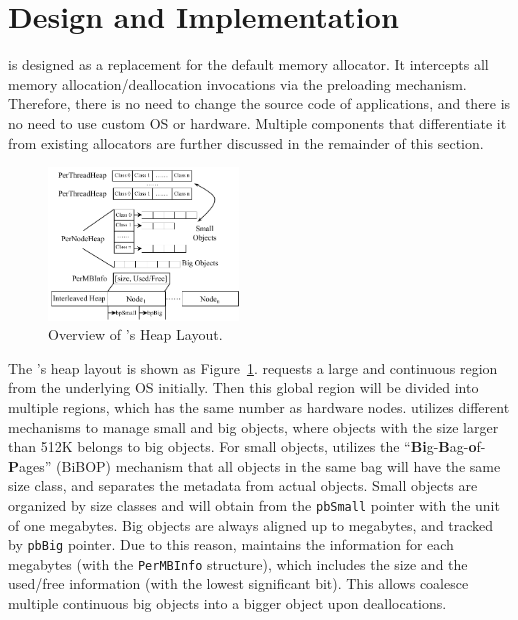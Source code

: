 \section{Design and Implementation}
\label{sec:implement}

\NM{} is designed as a replacement for the default memory allocator. It intercepts all memory allocation/deallocation invocations via the preloading mechanism. Therefore, there is no need to change the source code of applications, and there is no need to use custom OS or hardware. Multiple components that differentiate it from existing allocators are further discussed in the remainder of this section.

\begin{figure}[!ht]
\begin{center}
\includegraphics[width=0.45\textwidth]{figure/heaplayout1}
\end{center}
\vspace{-0.1in}
\caption{Overview of \NA{}'s Heap Layout.
\label{fig:overview}}
\vspace{-0.1in}
\end{figure}

The \NM{}'s heap layout is shown as Figure~\ref{fig:overview}. \NM{} requests a large and continuous region from the underlying OS initially. Then this global region will be divided into multiple regions, which has the same number as  hardware nodes. \NM{} utilizes different mechanisms to manage small and big objects, where objects with the size larger than 512K belongs to big objects. For small objects, \NM{} utilizes the ``\textbf{Bi}g-\textbf{B}ag-\textbf{o}f-\textbf{P}ages'' (BiBOP) mechanism that all objects in the same bag will have the same size class, and separates the metadata from actual objects. Small objects are organized by size classes and will obtain from the \texttt{pbSmall} pointer with the unit of one megabytes. Big objects are always aligned up to megabytes, and tracked by \texttt{pbBig} pointer. Due to this reason, \NM{} maintains the information for each megabytes (with the \texttt{PerMBInfo} structure), which includes the size and the used/free information (with the lowest significant bit). This allows  \NM{} coalesce multiple continuous big objects into a bigger object upon deallocations.  

